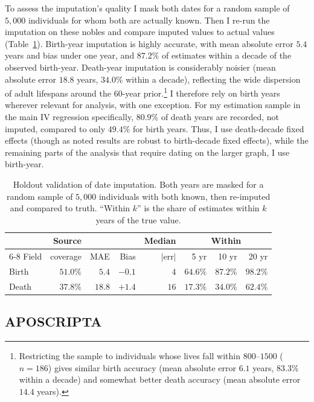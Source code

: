 \documentclass[12pt]{article}
\theoremstyle{definition}
\theoremstyle{remark}
\begin{document}
To assess the imputation's quality I mask both dates for a random sample of $5{,}000$ individuals for whom both are actually known. Then I re-run the imputation on these nobles and compare imputed values to actual values (Table~\ref{tab:app-imputation}). Birth-year imputation is highly accurate, with mean absolute error $5.4$ years and bias under one year, and $87.2\%$ of estimates within a decade of the observed birth-year. Death-year imputation is considerably noisier (mean absolute error $18.8$ years, $34.0\%$ within a decade), reflecting the wide dispersion of adult lifespans around the $60$-year prior.\footnote{Restricting the sample to individuals whose lives fall within $800$--$1500$ ($n=186$) gives similar birth accuracy (mean absolute error $6.1$ years, $83.3\%$ within a decade) and somewhat better death accuracy (mean absolute error $14.4$ years).} I therefore rely on birth years wherever relevant for analysis, with one exception. For my estimation sample in the main IV regression specifically, $80.9\%$ of death years are recorded, not imputed, compared to only $49.4\%$ for birth years. Thus, I use death-decade fixed effects (though as noted results are robust to birth-decade fixed effects), while the remaining parts of the analysis that require dating on the larger graph, I use birth-year.

\begin{table}[ht]
  \centering
  \caption{Holdout validation of date imputation. Both years are masked for a random sample of $5{,}000$ individuals with both known, then re-imputed and compared to truth. ``Within $k$'' is the share of estimates within $k$ years of the true value.}
  \label{tab:app-imputation}
  \begin{tabular}{l rr rr rrr}
    \toprule
    & Source & & & Median & \multicolumn{3}{c}{Within} \\
    \cmidrule(lr){6-8}
    Field & coverage & MAE & Bias & $|$err$|$ & 5 yr & 10 yr & 20 yr \\
    \midrule
    Birth & $51.0\%$ & $5.4$  & $-0.1$ & $4$  & $64.6\%$ & $87.2\%$ & $98.2\%$ \\
    Death & $37.8\%$ & $18.8$ & $+1.4$ & $16$ & $17.3\%$ & $34.0\%$ & $62.4\%$ \\
    \bottomrule
  \end{tabular}
\end{table}

\subsection{APOSCRIPTA}
\label{app:data-aposcripta}
\end{document}
